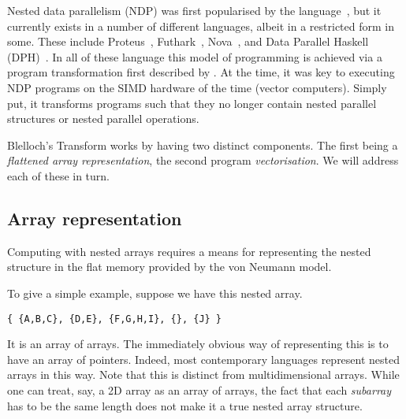 Nested data parallelism (NDP) was first popularised by the \nesl{} language~\cite{Blelloch:nesl1995}, but it currently exists in a number of different languages, albeit in a restricted form in some. These include Proteus~\cite{proteus-frontiers95}, Futhark~\cite{Henriksen:2017futhark}, Nova~\cite{collins2013nova}, and Data Parallel Haskell (DPH)~\cite{Jones:2008uu}. In all of these language this model of programming is achieved via a program transformation first described by \citet{Blelloch:compiling1988}. At the time, it was key to executing NDP programs on the SIMD hardware of the time (vector computers). Simply put, it transforms programs such that they no longer contain nested parallel structures or nested parallel operations.


Blelloch's Transform works by having two distinct components. The first being a \emph{flattened array representation}, the second program \emph{vectorisation}. We will address each of these in turn.

\subsection{Array representation}
\label{sec:background-representation}

Computing with nested arrays requires a means for representing the nested structure in the flat memory provided by the von Neumann model.

To give a simple example, suppose we have this nested array.
%
\begin{lstlisting}
{ {A,B,C}, {D,E}, {F,G,H,I}, {}, {J} }
\end{lstlisting}
%
It is an array of arrays. The immediately obvious way of representing this is to have an array of pointers. Indeed, most contemporary languages represent nested arrays in this way. Note that this is distinct from multidimensional arrays. While one can treat, say, a 2D array as an array of arrays, the fact that each \emph{subarray} has to be the same length does not make it a true nested array structure.

